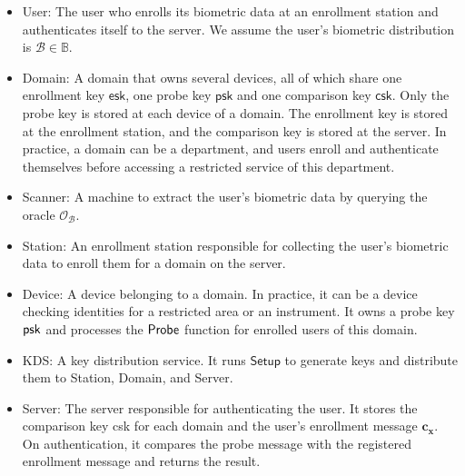 \begin{itemize}

	\item \textsf{User}: The user who enrolls its biometric data at an enrollment station and authenticates itself to the server. We assume the user's biometric distribution is $\mathcal{B} \in \mathbb{B}$.
	
	\item \textsf{Domain}: A domain that owns several devices, all of which share one enrollment key $\textsf{esk}$, one probe key $\textsf{psk}$ and one comparison key $\textsf{csk}$. Only the probe key is stored at each device of a domain. The enrollment key is stored at the enrollment station, and the comparison key is stored at the server. In practice, a domain can be a department, and users enroll and authenticate themselves before accessing a restricted service of this department.

	\item \textsf{Scanner}: A machine to extract the user's biometric data by querying the oracle $\mathcal{O}_{\mathcal{B}}$.
	
	\item \textsf{Station}: An enrollment station responsible for collecting the user's biometric data to enroll them for a domain on the server.

	\item \textsf{Device}: A device belonging to a domain. In practice, it can be a device checking identities for a restricted area or an instrument. It owns a probe key $\sf psk$ and processes the $\sf Probe$ function for enrolled users of this domain.
	
	\item \textsf{KDS}: A key distribution service. It runs $\textsf{Setup}$ to generate keys and distribute them to \textsf{Station}, \textsf{Domain}, and \textsf{Server}.
		
	\item \textsf{Server}: The server responsible for authenticating the user. It stores the comparison key \textsf{csk} for each domain and the user's enrollment message $\mathbf{c_x}$. On authentication, it compares the probe message with the registered enrollment message and returns the result.  

\end{itemize}





\pagebreak

